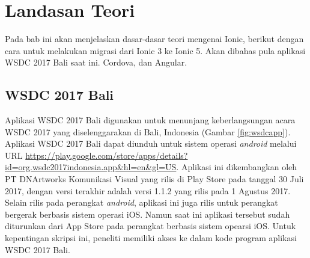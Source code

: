 \chapter{Landasan Teori}
\label{chap:teori}

Pada bab ini akan menjelaskan dasar-dasar teori mengenai Ionic, berikut dengan cara untuk melakukan migrasi dari Ionic 3 ke Ionic 5. Akan dibahas pula aplikasi WSDC 2017 Bali saat ini. Cordova, dan Angular.

\section{WSDC 2017 Bali}
\label{sec:wsdc2017bali}

Aplikasi WSDC 2017 Bali digunakan untuk menunjang keberlangsungan acara WSDC 2017 yang diselenggarakan di Bali, Indonesia (Gambar \ref{fig:wsdcapp}). Aplikasi WSDC 2017 Bali dapat diunduh untuk sistem operasi {\it android} melalui URL \url{https://play.google.com/store/apps/details?id=org.wsdc2017indonesia.app&hl=en&gl=US}. Aplikasi ini dikembangkan oleh PT DNArtworks Komunikasi Visual yang rilis di Play Store pada tanggal 30 Juli 2017, dengan versi terakhir adalah versi 1.1.2 yang rilis pada 1 Agustus 2017. Selain rilis pada perangkat {\it android}, aplikasi ini juga rilis untuk perangkat bergerak berbasis sistem operasi iOS. Namun saat ini aplikasi tersebut sudah diturunkan dari App Store pada perangkat berbasis sistem opearsi iOS. Untuk kepentingan skripsi ini, peneliti memiliki akses ke dalam kode program aplikasi WSDC 2017 Bali.

